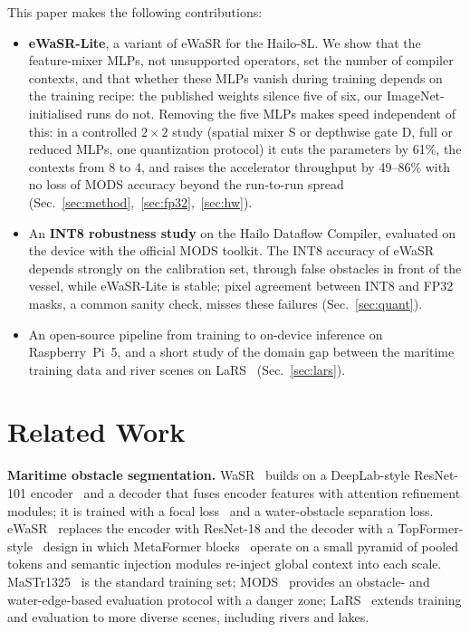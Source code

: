 \documentclass[conference]{IEEEtran}
\begin{document}
This paper makes the following contributions:
\begin{itemize}
\item \textbf{eWaSR-Lite}, a variant of eWaSR for the Hailo-8L. We show that the feature-mixer MLPs, not unsupported operators, set the number of compiler contexts, and that whether these MLPs vanish during training depends on the training recipe: the published weights silence five of six, our ImageNet-initialised runs do not. Removing the five MLPs makes speed independent of this: in a controlled $2\times2$ study (spatial mixer S or depthwise gate D, full or reduced MLPs, one quantization protocol) it cuts the parameters by 61\%, the contexts from 8 to 4, and raises the accelerator throughput by 49--86\% with no loss of MODS accuracy beyond the run-to-run spread (Sec.~\ref{sec:method},~\ref{sec:fp32},~\ref{sec:hw}).
\item An \textbf{INT8 robustness study} on the Hailo Dataflow Compiler, evaluated on the device with the official MODS toolkit. The INT8 accuracy of eWaSR depends strongly on the calibration set, through false obstacles in front of the vessel, while eWaSR-Lite is stable; pixel agreement between INT8 and FP32 masks, a common sanity check, misses these failures (Sec.~\ref{sec:quant}).
\item An open-source pipeline from training to on-device inference on Raspberry~Pi~5, and a short study of the domain gap between the maritime training data and river scenes on LaRS~\cite{zust2023lars} (Sec.~\ref{sec:lars}).
\end{itemize}

\section{Related Work}
\textbf{Maritime obstacle segmentation.} WaSR~\cite{bovcon2022wasr} builds on a DeepLab-style ResNet-101 encoder~\cite{chen2018deeplab,he2016resnet} and a decoder that fuses encoder features with attention refinement modules; it is trained with a focal loss~\cite{lin2017focal} and a water-obstacle separation loss. eWaSR~\cite{tersek2023ewasr} replaces the encoder with ResNet-18 and the decoder with a TopFormer-style~\cite{zhang2022topformer} design in which MetaFormer blocks~\cite{yu2022metaformer} operate on a small pyramid of pooled tokens and semantic injection modules re-inject global context into each scale. MaSTr1325~\cite{bovcon2019mastr} is the standard training set; MODS~\cite{bovcon2022mods} provides an obstacle- and water-edge-based evaluation protocol with a danger zone; LaRS~\cite{zust2023lars} extends training and evaluation to more diverse scenes, including rivers and lakes.
\end{document}
